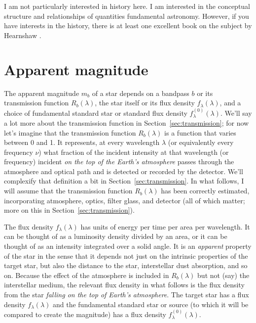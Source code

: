\documentclass[10pt]{article}
\newcommand{\sectionname}{Section}
\newcommand{\secref}[1]{\sectionname~\ref{#1}}
\begin{document}
I am not particularly interested in history here.
I am interested in the conceptual structure and relationships of quantities fundamental astronomy.
However, if you have interests in the history, there is at least one excellent book on the subject by Hearnshaw \cite{hearnshaw}.

\section{Apparent magnitude}\label{sec:mag}

The apparent magnitude $m_b$ of a star depends on a bandpass $b$ or its transmission function $R_b(\lambda)$, the star itself or its flux density $f_\lambda(\lambda)$, and a choice of fundamental standard star or standard flux density $f^{(0)}_\lambda(\lambda)$.
We'll say a lot more about the transmission function in \secref{sec:transmission};
for now let's imagine that the transmission function $R_b(\lambda)$ is a function that varies between 0 and 1.
It represents, at every wavelength $\lambda$ (or equivalently every frequency $\nu$) what fraction of the incident intensity at that wavelength (or frequency) incident \emph{on the top of the Earth's atmosphere} passes through the atmosphere and optical path and is detected or recorded by the detector.
We'll complexify that definition a bit in \secref{sec:transmission}.
In what follows, I will assume that the transmission function $R_b(\lambda)$ has been correctly estimated, incorporating atmosphere, optics, filter glass, and detector (all of which matter; more on this in \secref{sec:transmission}).

The flux density $f_\lambda(\lambda)$ has units of energy per time per area per wavelength.
It can be thought of as a luminosity density divided by an area, or it can be thought of as an intensity integrated over a solid angle.
It is an \emph{apparent} property of the star in the sense that it depends not just on the intrinsic properties of the target star, but also the distance to the star, interstellar dust absorption, and so on.
Because the effect of the atmosphere is included in $R_b(\lambda)$ but not (say) the interstellar medium, the relevant flux density in what follows is the flux density from the star \emph{falling on the top of Earth's atmosphere}.
The target star has a flux density $f_\lambda(\lambda)$ and the fundamental standard star or source (to which it will be compared to create the magnitude) has a flux density $f^{(0)}_\lambda(\lambda)$.
\end{document}
